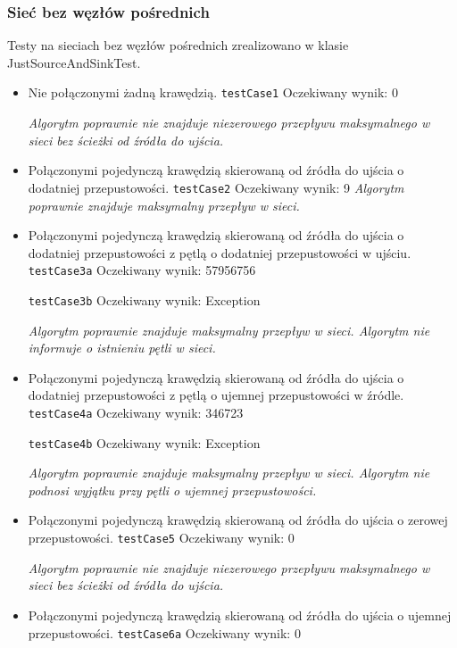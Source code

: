 \subsubsection{Sieć bez węzłów pośrednich}
Testy na sieciach bez węzłów pośrednich zrealizowano w klasie JustSourceAndSinkTest.
\begin{itemize}[nosep]
    \item Nie połączonymi żadną krawędzią.
    \texttt{testCase1}
    Oczekiwany wynik: 0

    \emph{Algorytm poprawnie nie znajduje niezerowego
    przepływu maksymalnego w sieci bez ścieżki od źródła do ujścia.}

    \item Połączonymi pojedynczą krawędzią skierowaną od źródła do ujścia o dodatniej przepustowości.
    \texttt{testCase2}
    Oczekiwany wynik: 9
    \emph{Algorytm poprawnie znajduje maksymalny przepływ w sieci.}

    \item Połączonymi pojedynczą krawędzią skierowaną od źródła do ujścia o dodatniej przepustowości z pętlą o dodatniej przepustowości w ujściu.
    \texttt{testCase3a}
    Oczekiwany wynik: 57956756

    \texttt{testCase3b}
    Oczekiwany wynik: Exception

    \emph{Algorytm poprawnie znajduje maksymalny przepływ
w sieci. Algorytm nie informuje o istnieniu pętli w sieci.}

    \item Połączonymi pojedynczą krawędzią skierowaną od źródła do ujścia o dodatniej przepustowości z pętlą o ujemnej przepustowości w źródle.
    \texttt{testCase4a}
    Oczekiwany wynik: 346723

    \texttt{testCase4b}
    Oczekiwany wynik: Exception

    \emph{Algorytm poprawnie znajduje maksymalny przepływ
    w sieci. Algorytm nie podnosi wyjątku przy pętli o ujemnej przepustowości.}

    \item Połączonymi pojedynczą krawędzią skierowaną od źródła do ujścia o zerowej przepustowości.
    \texttt{testCase5}
    Oczekiwany wynik: 0

    \emph{Algorytm poprawnie nie znajduje niezerowego przepływu
    maksymalnego w sieci bez ścieżki od źródła do ujścia.}

    \item Połączonymi pojedynczą krawędzią skierowaną od źródła do ujścia o ujemnej przepustowości.
    \texttt{testCase6a}
    Oczekiwany wynik: 0


\end{itemize}
